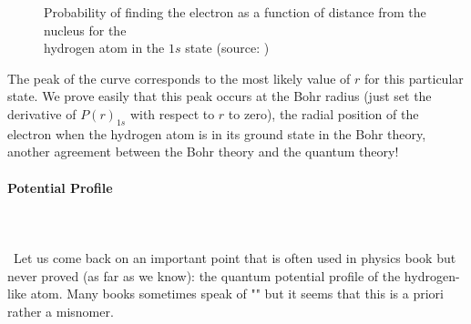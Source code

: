 \begin{figure}[H]
		\vspace*{3mm}
		\caption[Probability of finding the electron as a function of distance from the nucleus for the hydrogen atom in the $1s$ state]{Probability of finding the electron as a function of distance from the nucleus for the\\ hydrogen atom in the $1s$ state (source: \cite{serway2018physics})}
	\end{figure}
	The peak of the curve corresponds to the most likely value of $r$ for this particular state. We prove easily that this peak occurs at the Bohr radius (just set the derivative of $P(r)_{1s}$ with respect to $r$ to zero), the radial position of the electron when the hydrogen atom is in its ground state in the Bohr theory, another agreement between the Bohr theory and the quantum theory!
	
	\paragraph{Potential Profile}\mbox{}\\\\\
	Let us come back on an important point that is often used in physics book but never proved (as far as we know): the quantum potential profile of the hydrogen-like atom. Many books sometimes speak of "" but it seems that this is a priori rather a misnomer.


